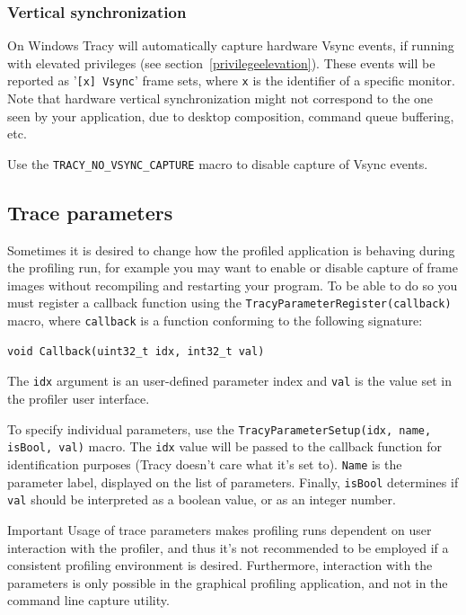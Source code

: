 \documentclass[hidelinks,titlepage,a4paper]{article}
\begin{document}
\subsubsection{Vertical synchronization}

On Windows Tracy will automatically capture hardware Vsync events, if running with elevated privileges (see section~\ref{privilegeelevation}). These events will be reported as '\texttt{[x] Vsync}' frame sets, where \texttt{x} is the identifier of a specific monitor. Note that hardware vertical synchronization might not correspond to the one seen by your application, due to desktop composition, command queue buffering, etc.

Use the \texttt{TRACY\_NO\_VSYNC\_CAPTURE} macro to disable capture of Vsync events.

\subsection{Trace parameters}
\label{traceparameters}

Sometimes it is desired to change how the profiled application is behaving during the profiling run, for example you may want to enable or disable capture of frame images without recompiling and restarting your program. To be able to do so you must register a callback function using the \texttt{TracyParameterRegister(callback)} macro, where \texttt{callback} is a function conforming to the following signature:

\begin{lstlisting}
void Callback(uint32_t idx, int32_t val)
\end{lstlisting}

The \texttt{idx} argument is an user-defined parameter index and \texttt{val} is the value set in the profiler user interface.

To specify individual parameters, use the \texttt{TracyParameterSetup(idx, name, isBool, val)} macro. The \texttt{idx} value will be passed to the callback function for identification purposes (Tracy doesn't care what it's set to). \texttt{Name} is the parameter label,  displayed on the list of parameters. Finally, \texttt{isBool} determines if \texttt{val} should be interpreted as a boolean value, or as an integer number.

\begin{bclogo}[
noborder=true,
couleur=black!5,
logo=\bcbombe
]{Important}
Usage of trace parameters makes profiling runs dependent on user interaction with the profiler, and thus it's not recommended to be employed if a consistent profiling environment is desired. Furthermore, interaction with the parameters is only possible in the graphical profiling application, and not in the command line capture utility.
\end{bclogo}
\end{document}

